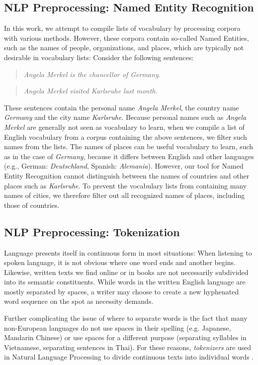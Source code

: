 \subsection{NLP Preprocessing: Named Entity Recognition}
In this work, we attempt to compile lists of vocabulary by processing corpora with various methods.
However, these corpora contain so-called Named Entities, such as the names of people, organizations, and places, which are typically not desirable in vocabulary lists:
Consider the following sentences:

\begin{quote}
	\textit{Angela Merkel is the chancellor of Germany.}
\end{quote}

\begin{quote}
	\textit{Angela Merkel visited Karlsruhe last month.}
\end{quote}

These sentences contain the personal name \textit{Angela Merkel}, the country name \textit{Germany} and the city name \textit{Karlsruhe}.
Because personal names such as \textit{Angela Merkel} are generally not seen as vocabulary to learn, when we compile a list of English vocabulary from a corpus containing the above sentences, we filter such names from the lists.
The names of places can be useful vocabulary to learn, such as in the case of \textit{Germany}, because it differs between English and other languages (e.g., German: \textit{Deutschland}, Spanish: \textit{Alemania}).
However, our tool for Named Entity Recognition cannot distinguish between the names of countries and other places such as \textit{Karlsruhe}.
To prevent the vocabulary lists from containing many names of cities, we therefore filter out all recognized names of places, including those of countries.


\subsection{NLP Preprocessing: Tokenization}
Language presents itself in continuous form in most situations:
When listening to spoken language, it is not obvious where one word ends and another begins.
Likewise, written texts we find online or in books are not necessarily subdivided into its semantic constituents.
While words in the written English language are mostly separated by spaces, a writer may choose to create a new hyphenated word sequence on the spot as necessity demands.

Further complicating the issue of where to separate words is the fact that many non-European languages do not use spaces in their spelling (e.g. Japanese, Mandarin Chinese) or use spaces for a different purpose (separating syllables in Vietnamese, separating sentences in Thai).
For these reasons, \textit{tokenizers} are used in Natural Language Processing to divide continuous texts into individual words \cite{jurafskySpeechLanguageProcessing2025}.

